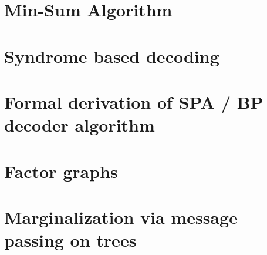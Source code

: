 \section{Min-Sum Algorithm}
\section{Syndrome based decoding}

\section{Formal derivation of SPA / BP decoder algorithm}
\section{Factor graphs}
\section{Marginalization via message passing on trees}
